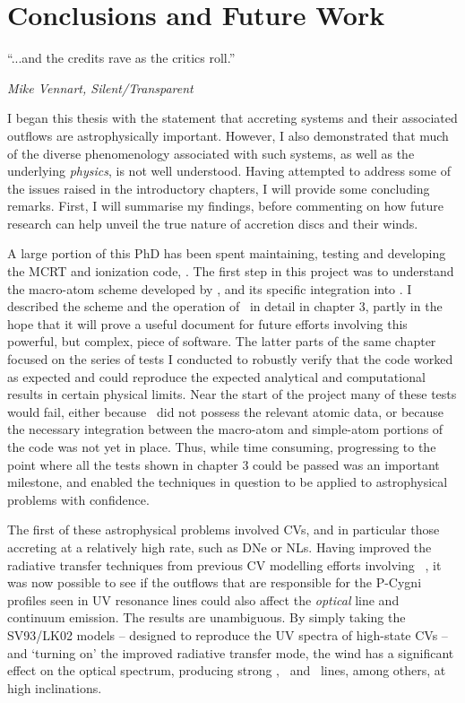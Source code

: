 \chapter{Conclusions and Future Work}

\epigraph{``...and the credits rave as the critics roll.''}
{{\sl Mike Vennart, Silent/Transparent}}

I began this thesis with the statement that accreting systems
and their associated outflows are astrophysically important. However, I also
demonstrated that much of the diverse phenomenology associated with such systems, as well
as the underlying {\em physics}, is not well understood.  
Having attempted to address some of the issues raised in the 
introductory chapters, I will provide some concluding remarks. 
First, I will summarise my findings, before 
commenting on how future research can help unveil the true nature of 
accretion discs and their winds.

A large portion of this PhD has been spent maintaining,
testing and developing the MCRT and ionization code, \py. The first 
step in this project was to understand the macro-atom scheme
developed by \cite{lucy2002,lucy2003}, and its specific integration
into \py. I described the scheme and the operation of \py\ in detail
in chapter 3, partly in the hope that it will prove a useful document
for future efforts involving this powerful, but complex, piece of software.
The latter parts of the same chapter focused on the series of tests
I conducted to robustly verify that the code worked as expected and 
could reproduce the expected analytical and computational results in certain
physical limits. Near the start of the project many of these tests
would fail, either because \py\ did not possess the relevant atomic data,
or because the necessary integration between the macro-atom and simple-atom
portions of the code was not yet in place. Thus, while time consuming,
progressing to the point where all the tests shown in chapter 3 could be
passed was an important milestone, and enabled the techniques in question
to be applied to astrophysical problems with confidence.

The first of these astrophysical problems involved CVs, and in particular
those accreting at a relatively high rate, such as DNe or NLs. Having 
improved the radiative transfer techniques from previous CV modelling efforts
involving \py\ \citep[LK02, ][]{noebauer}, it was now possible to see
if the outflows that are responsible for the P-Cygni profiles seen
in UV resonance lines could also affect the {\em optical} line and continuum
emission. The results are unambiguous. By simply taking the SV93/LK02
models -- designed to reproduce the UV spectra of high-state CVs --
and `turning on' the improved radiative transfer mode, the wind
has a significant effect on the optical spectrum, producing strong
\ha, \heiiopt\ and \heiioptnew\ lines, among others, at high inclinations.

